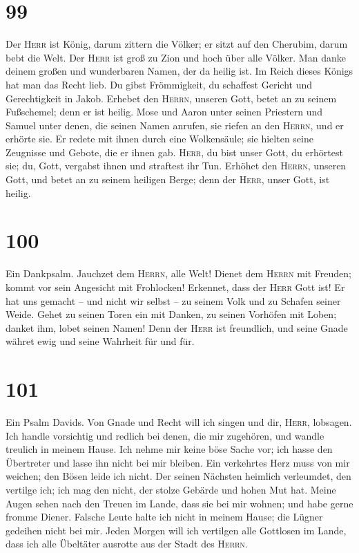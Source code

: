 \hypertarget{section-98}{%
\section{99}\label{section-98}}

 Der \textsc{Herr} ist König, darum zittern die Völker; er
sitzt auf den Cherubim, darum bebt die Welt.  Der
\textsc{Herr} ist groß zu Zion und hoch über alle Völker. 
Man danke deinem großen und wunderbaren Namen, der da heilig ist.
 Im Reich dieses Königs hat man das Recht lieb. Du gibst
Frömmigkeit, du schaffest Gericht und Gerechtigkeit in Jakob.
 Erhebet den \textsc{Herrn}, unseren Gott, betet an zu
seinem Fußschemel; denn er ist heilig.  Mose und Aaron
unter seinen Priestern und Samuel unter denen, die seinen Namen anrufen,
sie riefen an den \textsc{Herrn}, und er erhörte sie.  Er
redete mit ihnen durch eine Wolkensäule; sie hielten seine Zeugnisse und
Gebote, die er ihnen gab.  \textsc{Herr}, du bist unser
Gott, du erhörtest sie; du, Gott, vergabst ihnen und straftest ihr Tun.
 Erhöhet den \textsc{Herrn}, unseren Gott, und betet an zu
seinem heiligen Berge; denn der \textsc{Herr}, unser Gott, ist heilig.

\hypertarget{section-99}{%
\section{100}\label{section-99}}

 Ein Dankpsalm. Jauchzet dem \textsc{Herrn}, alle Welt!
 Dienet dem \textsc{Herrn} mit Freuden; kommt vor sein
Angesicht mit Frohlocken!  Erkennet, dass der
\textsc{Herr} Gott ist! Er hat uns gemacht -- und nicht wir selbst -- zu
seinem Volk und zu Schafen seiner Weide.  Gehet zu seinen
Toren ein mit Danken, zu seinen Vorhöfen mit Loben; danket ihm, lobet
seinen Namen!  Denn der \textsc{Herr} ist freundlich, und
seine Gnade währet ewig und seine Wahrheit für und für.

\hypertarget{section-100}{%
\section{101}\label{section-100}}

 Ein Psalm Davids. Von Gnade und Recht will ich singen und
dir, \textsc{Herr}, lobsagen.  Ich handle vorsichtig und
redlich bei denen, die mir zugehören, und wandle treulich in meinem
Hause.  Ich nehme mir keine böse Sache vor; ich hasse den
Übertreter und lasse ihn nicht bei mir bleiben.  Ein
verkehrtes Herz muss von mir weichen; den Bösen leide ich nicht.
 Der seinen Nächsten heimlich verleumdet, den vertilge
ich; ich mag den nicht, der stolze Gebärde und hohen Mut hat.
 Meine Augen sehen nach den Treuen im Lande, dass sie bei
mir wohnen; und habe gerne fromme Diener.  Falsche Leute
halte ich nicht in meinem Hause; die Lügner gedeihen nicht bei mir.
 Jeden Morgen will ich vertilgen alle Gottlosen im Lande,
dass ich alle Übeltäter ausrotte aus der Stadt des \textsc{Herrn}.

